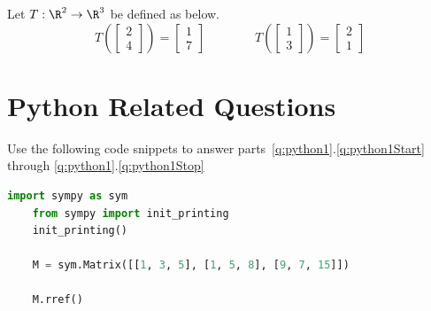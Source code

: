 \documentclass[12pt,addpoints]{exam}
\begin{document}
\begin{questions}
        \vfill\newpage
        \question Let $T:\R^2\rightarrow\R^3$ be defined as below.
        \[
            T\left(\begin{bmatrix} 2 \\ 4 \end{bmatrix}\right) = \begin{bmatrix} 1 \\ 7 \end{bmatrix}
                \qquad\qquad
            T\left(\begin{bmatrix} 1 \\ 3 \end{bmatrix}\right) = \begin{bmatrix} 2 \\ 1 \end{bmatrix}
        \]
        \newpage
        \section*{Python Related Questions}
        \question\label{q:python1} Use the following code snippets to answer parts~\ref{q:python1}.\ref{q:python1Start} through
        \ref{q:python1}.\ref{q:python1Stop}
        \begin{lstlisting}[language=Python]
    import sympy as sym
    from sympy import init_printing
    init_printing()

    M = sym.Matrix([[1, 3, 5], [1, 5, 8], [9, 7, 15]])

    M.rref()
        \end{lstlisting}
\end{questions}
\end{document}
